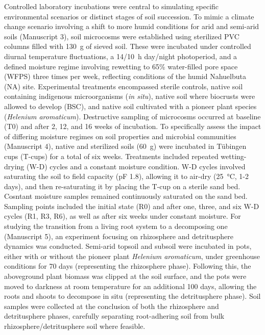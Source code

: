 Controlled laboratory incubations were central to simulating specific environmental scenarios or distinct stages of soil succession. To mimic a climate change scenario involving a shift to more humid conditions for arid and semi-arid soils (Manuscript 3), soil microcosms were established using sterilized PVC columns filled with \SI{130}{\gram} of sieved soil. These were incubated under controlled diurnal temperature fluctuations, a 14/\SI{10}{\hour} day/night photoperiod, and a defined moisture regime involving rewetting to 65\% water-filled pore space (WFPS) three times per week, reflecting conditions of the humid Nahuelbuta (NA) site. Experimental treatments encompassed sterile controls, native soil containing indigenous microorganisms (\textit{in situ}), native soil where biocrusts were allowed to develop (BSC), and native soil cultivated with a pioneer plant species (\textit{Helenium aromaticum}). Destructive sampling of microcosms occurred at baseline (T0) and after 2, 12, and 16 weeks of incubation. To specifically assess the impact of differing moisture regimes on soil properties and microbial communities (Manuscript 4), native and sterilized soils (\SI{60}{\gram}) were incubated in Tübingen cups (T-cups) for a total of six weeks. Treatments included repeated wetting-drying (W-D) cycles and a constant moisture condition. W-D cycles involved saturating the soil to field capacity (pF 1.8), allowing it to air-dry (\SI{25}{\degreeCelsius}, 1-2 days), and then re-saturating it by placing the T-cup on a sterile sand bed. Cosntant moisture samples remained continuously saturated on the sand bed. Sampling points included the initial state (R0) and after one, three, and six W-D cycles (R1, R3, R6), as well as after six weeks under constant moisture. For studying the transition from a living root system to a decomposing one (Manuscript 5), an experiment focusing on rhizosphere and detritusphere dynamics was conducted. Semi-arid topsoil and subsoil were incubated in pots, either with or without the pioneer plant \textit{Helenium aromaticum}, under greenhouse conditions for 70 days (representing the rhizosphere phase). Following this, the aboveground plant biomass was clipped at the soil surface, and the pots were moved to darkness at room temperature for an additional 100 days, allowing the roots and shoots to decompose in situ (representing the detritusphere phase). Soil samples were collected at the conclusion of both the rhizosphere and detritusphere phases, carefully separating root-adhering soil from bulk rhizosphere/detritusphere soil where feasible.

